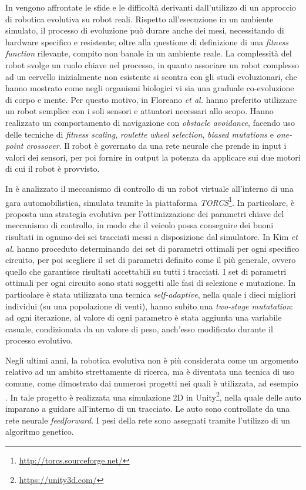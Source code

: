 \documentclass[a4paper,12pt]{article}
\begin{document}
In \cite{PhysicalRobotEvolution} vengono affrontate le sfide e le difficoltà derivanti dall'utilizzo di un approccio di robotica evolutiva su robot reali. Rispetto all'esecuzione in un ambiente simulato, il processo di evoluzione può durare anche dei mesi, necessitando di hardware specifico e resistente; oltre alla questione di definizione di una \emph{fitness function} rilevante, compito non banale in un ambiente reale. La complessità del robot svolge un ruolo chiave nel processo, in quanto associare un robot complesso ad un cervello inizialmente non esistente si scontra con gli studi evoluzionari, che hanno mostrato come negli organismi biologici vi sia una graduale co-evoluzione di corpo e mente. Per questo motivo, in \cite{PhysicalRobotEvolution} Floreano \emph{et al.} hanno preferito utilizzare un robot semplice con i soli sensori e attuatori necessari allo scopo. Hanno realizzato un comportamento di navigazione con \emph{obstacle avoidance}, facendo uso delle tecniche di \emph{fitness scaling}, \emph{roulette wheel selection}, \emph{biased mutations} e \emph{one-point crossover}. Il robot è governato da una rete neurale che prende in input i valori dei sensori, per poi fornire in output la potenza da applicare sui due motori di cui il robot è provvisto.

In \cite{TorcsController} è analizzato il meccanismo di controllo di un robot virtuale all'interno di una gara automobilistica, simulata tramite la piattaforma \emph{TORCS}\footnote{\url{http://torcs.sourceforge.net/}}. In particolare, è proposta una strategia evolutiva per l'ottimizzazione dei parametri chiave del meccanismo di controllo, in modo che il veicolo possa conseguire dei buoni risultati in ognuno dei sei tracciati messi a disposizione dal simulatore. In \cite{TorcsController} Kim \emph{et al.} hanno proceduto determinando dei set di parametri ottimali per ogni specifico circuito, per poi scegliere il set di parametri definito come il più generale, ovvero quello che garantisce risultati accettabili su tutti i tracciati. I set di parametri ottimali per ogni circuito sono stati soggetti alle fasi di selezione e mutazione. In particolare è stata utilizzata una tecnica \emph{self-adaptive}, nella quale i dieci migliori individui (su una popolazione di venti), hanno subito una \emph{two-stage mutatation}: ad ogni iterazione, al valore di ogni parametro è stata aggiunta una variabile casuale, condizionata da un valore di peso, anch'esso modificato durante il processo evolutivo.

Negli ultimi anni, la robotica evolutiva non è più considerata come un argomento relativo ad un ambito strettamente di ricerca, ma è diventata una tecnica di uso comune, come dimostrato dai numerosi progetti nei quali è utilizzata, ad esempio \cite{arztRepo}. In tale progetto è realizzata una simulazione 2D in Unity\footnote{\url{https://unity3d.com/}}, nella quale delle auto imparano a guidare all'interno di un tracciato. Le auto sono controllate da una rete neurale \emph{feedforward}. I pesi della rete sono assegnati tramite l'utilizzo di un algoritmo genetico.
\end{document}
